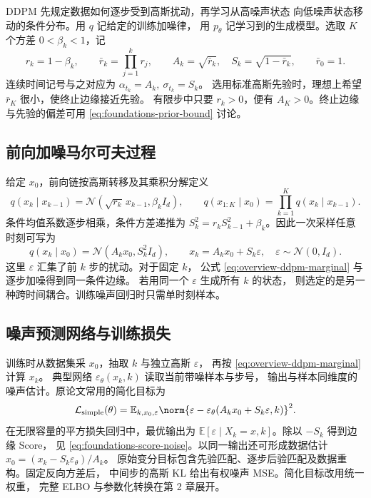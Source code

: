 DDPM \cite{ho2020ddpm} 先规定数据如何逐步受到高斯扰动，再学习从高噪声状态
向低噪声状态移动的条件分布。用 \(q\) 记给定的训练加噪律，
用 \(p_\theta\) 记学习到的生成模型。选取 \(K\) 个方差 \(0<\beta_k<1\)，记
\[
  r_k=1-\beta_k,\qquad \bar r_k=\prod_{j=1}^{k}r_j,\qquad
  A_k=\sqrt{\bar r_k},\quad S_k=\sqrt{1-\bar r_k},
  \qquad \bar r_0=1 .
\]
连续时间记号与之对应为 \(\alpha_{t_k}=A_k,\ \sigma_{t_k}=S_k\)。
选用标准高斯先验时，理想上希望 \(\bar r_K\) 很小，使终止边缘接近先验。
有限步中只要 \(r_k>0\)，便有 \(A_K>0\)。终止边缘与先验的偏差可用
\eqref{eq:foundations-prior-bound} 讨论。

\subsection{前向加噪马尔可夫过程}

给定 \(x_0\)，前向链按高斯转移及其乘积分解定义
\begin{equation}
  q(x_k\mid x_{k-1})
    =\mathcal N(\sqrt{r_k}\,x_{k-1},\beta_k I_d),\qquad
  q(x_{1:K}\mid x_0)=\prod_{k=1}^{K}q(x_k\mid x_{k-1}) .
  \label{eq:overview-ddpm-forward}
\end{equation}
条件均值系数逐步相乘，条件方差递推为
\(S_k^2=r_kS_{k-1}^2+\beta_k\)。因此一次采样任意时刻可写为
\begin{equation}
  q(x_k\mid x_0)=\mathcal N(A_kx_0,S_k^2I_d),\qquad
  x_k=A_kx_0+S_k\varepsilon,\quad\varepsilon\sim\mathcal N(0,I_d).
  \label{eq:overview-ddpm-marginal}
\end{equation}
这里 \(\varepsilon\) 汇集了前 \(k\) 步的扰动。对于固定 \(k\)，
公式 \eqref{eq:overview-ddpm-marginal} 与逐步加噪得到同一条件边缘。
若用同一个 \(\varepsilon\) 生成所有 \(k\) 的状态，
则选定的是另一种跨时间耦合。训练噪声回归时只需单时刻样本。

\subsection{噪声预测网络与训练损失}

训练时从数据集采 \(x_0\)，抽取 \(k\) 与独立高斯 \(\varepsilon\)，
再按 \eqref{eq:overview-ddpm-marginal} 计算 \(x_k\)。
典型网络 \(\varepsilon_\theta(x_k,k)\) 读取当前带噪样本与步号，
输出与样本同维度的噪声估计。原论文常用的简化目标为
\begin{equation}
  \mathcal L_{\mathrm{simple}}(\theta)
    =\mathbb E_{k,x_0,\varepsilon}
      \norm{\varepsilon-\varepsilon_\theta(A_kx_0+S_k\varepsilon,k)}^2 .
  \label{eq:overview-ddpm-loss}
\end{equation}
在无限容量的平方损失回归中，最优输出为
\(\mathbb E[\varepsilon\mid X_k=x,k]\)。除以 \(-S_k\) 得到边缘 Score，
见 \eqref{eq:foundations-score-noise}。以同一输出还可形成数据估计
\(\widehat x_0=(x_k-S_k\varepsilon_\theta)/A_k\)。
原始变分目标包含先验匹配、逐步后验匹配及数据重构。固定反向方差后，
中间步的高斯 KL 给出有权噪声 MSE。简化目标改用统一权重，
完整 ELBO 与参数化转换在第 2 章展开。

